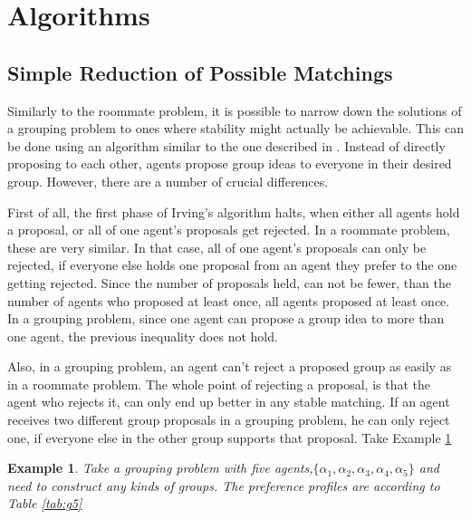 \documentclass{elsarticle}
\newtheorem{myex}{Example}
\begin{document}
\section{Algorithms}

\subsection{Simple Reduction of Possible Matchings}

Similarly to the roommate problem, it is possible to narrow down the solutions of a grouping problem to ones where stability might actually be achievable. This can be done using an algorithm similar to the one described in \citep{irving85}. Instead of directly proposing to each other, agents propose group ideas to everyone in their desired group. However, there are a number of crucial differences.

First of all, the first phase of Irving's algorithm halts, when either all agents hold a proposal, or all of one agent's proposals get rejected. In a roommate problem, these are very similar. In that case, all of one agent's proposals can only be rejected, if everyone else holds one proposal from an agent they prefer to the one getting rejected. Since the number of proposals held, can not be fewer, than the number of agents who proposed at least once, all agents proposed at least once. In a grouping problem, since one agent can propose a group idea to more than one agent, the previous inequality does not hold.

Also, in a grouping problem, an agent can't reject a proposed group as easily as in a roommate problem. The whole point of rejecting a proposal, is that the agent who rejects it, can only end up better in any stable matching. If an agent receives two different group proposals in a grouping problem, he can only reject one, if everyone else in the other group supports that proposal. Take Example \ref{ex:g5}

\begin{myex}

\label{ex:g5}
Take a grouping problem with five agents,$ \{ \alpha_1, \alpha_2, \alpha_3, \alpha_4, \alpha_5\} $ and need to construct any kinds of groups. The preference profiles are according to Table \ref{tab:g5} 
\end{myex}
\end{document}
